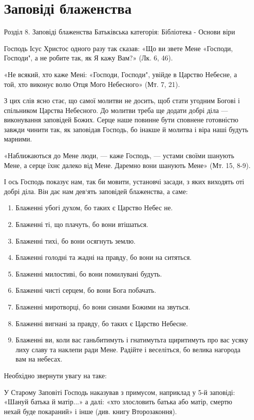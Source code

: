 \documentclass[main.tex]{subfiles}
\begin{document}
\chapter{Заповіді блаженства}
Розділ 8. Заповіді блаженства
Батьківська категорія: Бібліотека - Основи віри
 
 
Господь Ісус Христос одного разу так сказав: «Що ви звете Мене «Господи, Господи", а не робите так, як Я кажу Вам?» (Лк. 6, 46).

«Не всякий, хто каже Мені: «Господи, Господи", увійде в Царство Небесне, а той, хто виконує волю Отця Мого Небесного» (Мт. 7, 21).

З цих слів ясно стає, що самої молитви не досить, щоб стати угодним Богові і спільником Царства Небесного. До молитви треба ще додати добрі діла — виконування заповідей Божих. Серце наше повинне бути сповнене готовністю завжди чинити так, як заповідав Господь, бо інакше й молитва і віра наші будуть марними.

«Наближаються до Мене люди, — каже Господь, — устами своїми шанують Мене, а серце їхнє далеко від Мене. Даремно вони шанують Мене» (Мт. 15, 8-9).

І ось Господь показує нам, так би мовити, установчі засади, з яких виходять оті добрі діла. Він дає нам дев`ять заповідей блаженства, а саме:
\begin{enumerate}
    \item Блаженні убогі духом, бо таких є Царство Небес
    не.
    \item Блаженні ті, що плачуть, бо вони втішаться.
    \item Блаженні тихі, бо вони осягнуть землю.
    \item Блаженні голодні та жадні на правду, бо вони на
    ситяться.
    \item Блаженні милостиві, бо вони помилувані будуть.
    \item Блаженні чисті серцем, бо вони Бога побачать.
    \item Блаженні миротворці, бо вони синами Божими на
    звуться.
    \item Блаженні вигнані за правду, бо таких є Царство
    Небесне.
    \item Блаженні ви, коли вас ганьбитимуть і гнатимутьта щиритимуть про вас усяку лиху славу та наклепи ради Мене. Радійте і веселіться, бо велика нагорода вам на небесах.
\end{enumerate}

Необхідно звернути увагу на таке:

У Старому Заповіті Господь наказував з примусом, наприклад у 5-й заповіді: «Шануй батька й матір...» а далі: «хто злословить батька або матір, смертю нехай буде покараний» і інше (див. книгу Второзаконня).
\end{document}
